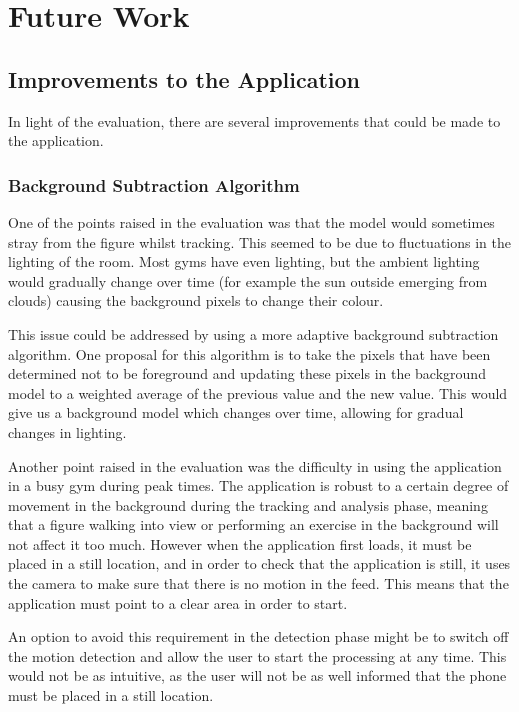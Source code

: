 \chapter{Future Work}
\label{sec:future}

\section{Improvements to the Application}
\label{sec:improvements}

In light of the evaluation, there are several improvements that could be made to the application.

\subsection{Background Subtraction Algorithm}
\label{sec:future_bgsub}

One of the points raised in the evaluation was that the model would sometimes stray from the figure whilst tracking. This seemed to be due to fluctuations in the lighting of the room. Most gyms have even lighting, but the ambient lighting would gradually change over time (for example the sun outside emerging from clouds) causing the background pixels to change their colour.

This issue could be addressed by using a more adaptive background subtraction algorithm. One proposal for this algorithm is to take the pixels that have been determined not to be foreground and updating these pixels in the background model to a weighted average of the previous value and the new value. This would give us a background model which changes over time, allowing for gradual changes in lighting.

Another point raised in the evaluation was the difficulty in using the application in a busy gym during peak times. The application is robust to a certain degree of movement in the background during the tracking and analysis phase, meaning that a figure walking into view or performing an exercise in the background will not affect it too much. However when the application first loads, it must be placed in a still location, and in order to check that the application is still, it uses the camera to make sure that there is no motion in the feed. This means that the application must point to a clear area in order to start.

An option to avoid this requirement in the detection phase might be to switch off the motion detection and allow the user to start the processing at any time. This would not be as intuitive, as the user will not be as well informed that the phone must be placed in a still location.

